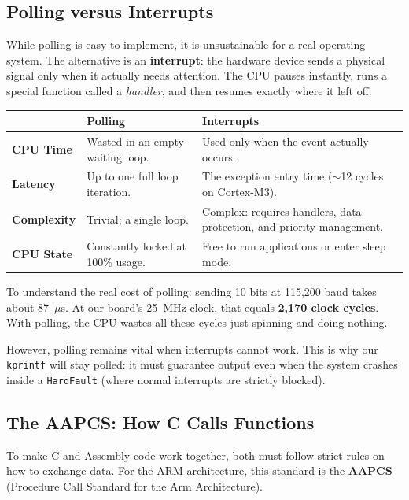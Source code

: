 \subsection{Polling versus Interrupts}
While polling is easy to implement, it is unsustainable for a real operating system. The alternative is an \textbf{interrupt}: the hardware device sends a physical signal only when it actually needs attention. The CPU pauses instantly, runs a special function called a \textit{handler}, and then resumes exactly where it left off.

\begin{table}[h!]
    \centering
    \begin{tabular}{p{2.5cm}p{5.5cm}p{6cm}}
        \toprule
        & \textbf{Polling} & \textbf{Interrupts} \\
        \midrule
        \textbf{CPU Time} & Wasted in an empty waiting loop. & Used only when the event actually occurs. \\
        \textbf{Latency} & Up to one full loop iteration. & The exception entry time ($\sim$12 cycles on Cortex-M3). \\
        \textbf{Complexity} & Trivial; a single loop. & Complex: requires handlers, data protection, and priority management. \\
        \textbf{CPU State} & Constantly locked at 100\% usage. & Free to run applications or enter sleep mode. \\
        \bottomrule
    \end{tabular}
\end{table}

To understand the real cost of polling: sending 10 bits at 115,200 baud takes about 87~$\mu$s. At our board's 25~MHz clock, that equals \textbf{2,170 clock cycles}. With polling, the CPU wastes all these cycles just spinning and doing nothing. 

However, polling remains vital when interrupts cannot work. This is why our \texttt{kprintf} will stay polled: it must guarantee output even when the system crashes inside a \texttt{HardFault} (where normal interrupts are strictly blocked).

\subsection{The AAPCS: How C Calls Functions}
To make C and Assembly code work together, both must follow strict rules on how to exchange data. For the ARM architecture, this standard is the \textbf{AAPCS} (Procedure Call Standard for the Arm Architecture).

